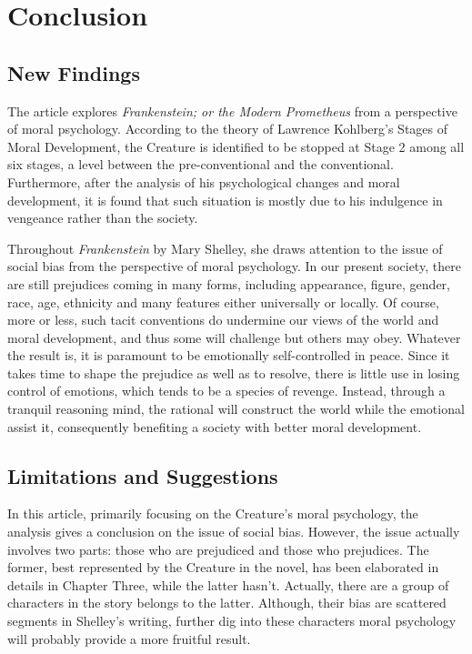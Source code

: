 \chapter{Conclusion} %
\label{cha:conclusion}
\section{New Findings} %
\label{sec:new_findings}
\begin{text}

The article explores \textit{Frankenstein; or the Modern Prometheus} from a perspective of moral psychology. According to the theory of Lawrence Kohlberg's Stages of Moral Development, the Creature is identified to be stopped at Stage 2\textonehalf{} among all six stages, a level between the pre-conventional and the conventional. Furthermore, after the analysis of his psychological changes and moral development, it is found that such situation is mostly due to his indulgence in vengeance rather than the society.

Throughout \textit{Frankenstein} by Mary Shelley, she draws attention to the issue of social bias from the perspective of moral psychology. In our present society, there are still prejudices coming in many forms, including appearance, figure, gender, race, age, ethnicity and many features either universally or locally. Of course, more or less, such tacit conventions do undermine our views of the world and moral development, and thus some will challenge but others may obey. Whatever the result is, it is paramount to be emotionally self-controlled in peace. Since it takes time to shape the prejudice as well as to resolve, there is little use in losing control of emotions, which tends to be a species of revenge. Instead, through a tranquil reasoning mind, the rational will construct the world while the emotional assist it, consequently benefiting a society with better moral development.

\end{text}
\section{Limitations and Suggestions} %
\label{sec:limitations_and_suggestions}
\begin{text}

In this article, primarily focusing on the Creature's moral psychology, the analysis gives a conclusion on the issue of social bias. However, the issue actually involves two parts: those who are prejudiced and those who prejudices. The former, best represented by the Creature in the novel, has been elaborated in details in Chapter Three, while the latter hasn't. Actually, there are a group of characters in the story belongs to the latter. Although, their bias are scattered segments in Shelley's writing, further dig into these characters moral psychology will probably provide a more fruitful result.
\end{text}
